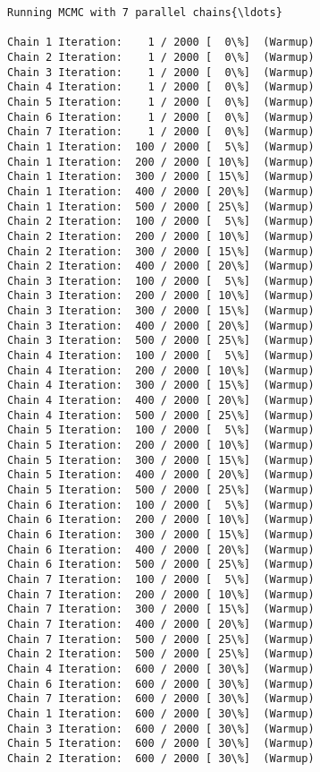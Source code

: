 \documentclass[11pt]{article}
\begin{document}
    \begin{Verbatim}[commandchars=\\\{\}]
Running MCMC with 7 parallel chains{\ldots}

Chain 1 Iteration:    1 / 2000 [  0\%]  (Warmup)
Chain 2 Iteration:    1 / 2000 [  0\%]  (Warmup)
Chain 3 Iteration:    1 / 2000 [  0\%]  (Warmup)
Chain 4 Iteration:    1 / 2000 [  0\%]  (Warmup)
Chain 5 Iteration:    1 / 2000 [  0\%]  (Warmup)
Chain 6 Iteration:    1 / 2000 [  0\%]  (Warmup)
Chain 7 Iteration:    1 / 2000 [  0\%]  (Warmup)
Chain 1 Iteration:  100 / 2000 [  5\%]  (Warmup)
Chain 1 Iteration:  200 / 2000 [ 10\%]  (Warmup)
Chain 1 Iteration:  300 / 2000 [ 15\%]  (Warmup)
Chain 1 Iteration:  400 / 2000 [ 20\%]  (Warmup)
Chain 1 Iteration:  500 / 2000 [ 25\%]  (Warmup)
Chain 2 Iteration:  100 / 2000 [  5\%]  (Warmup)
Chain 2 Iteration:  200 / 2000 [ 10\%]  (Warmup)
Chain 2 Iteration:  300 / 2000 [ 15\%]  (Warmup)
Chain 2 Iteration:  400 / 2000 [ 20\%]  (Warmup)
Chain 3 Iteration:  100 / 2000 [  5\%]  (Warmup)
Chain 3 Iteration:  200 / 2000 [ 10\%]  (Warmup)
Chain 3 Iteration:  300 / 2000 [ 15\%]  (Warmup)
Chain 3 Iteration:  400 / 2000 [ 20\%]  (Warmup)
Chain 3 Iteration:  500 / 2000 [ 25\%]  (Warmup)
Chain 4 Iteration:  100 / 2000 [  5\%]  (Warmup)
Chain 4 Iteration:  200 / 2000 [ 10\%]  (Warmup)
Chain 4 Iteration:  300 / 2000 [ 15\%]  (Warmup)
Chain 4 Iteration:  400 / 2000 [ 20\%]  (Warmup)
Chain 4 Iteration:  500 / 2000 [ 25\%]  (Warmup)
Chain 5 Iteration:  100 / 2000 [  5\%]  (Warmup)
Chain 5 Iteration:  200 / 2000 [ 10\%]  (Warmup)
Chain 5 Iteration:  300 / 2000 [ 15\%]  (Warmup)
Chain 5 Iteration:  400 / 2000 [ 20\%]  (Warmup)
Chain 5 Iteration:  500 / 2000 [ 25\%]  (Warmup)
Chain 6 Iteration:  100 / 2000 [  5\%]  (Warmup)
Chain 6 Iteration:  200 / 2000 [ 10\%]  (Warmup)
Chain 6 Iteration:  300 / 2000 [ 15\%]  (Warmup)
Chain 6 Iteration:  400 / 2000 [ 20\%]  (Warmup)
Chain 6 Iteration:  500 / 2000 [ 25\%]  (Warmup)
Chain 7 Iteration:  100 / 2000 [  5\%]  (Warmup)
Chain 7 Iteration:  200 / 2000 [ 10\%]  (Warmup)
Chain 7 Iteration:  300 / 2000 [ 15\%]  (Warmup)
Chain 7 Iteration:  400 / 2000 [ 20\%]  (Warmup)
Chain 7 Iteration:  500 / 2000 [ 25\%]  (Warmup)
Chain 2 Iteration:  500 / 2000 [ 25\%]  (Warmup)
Chain 4 Iteration:  600 / 2000 [ 30\%]  (Warmup)
Chain 6 Iteration:  600 / 2000 [ 30\%]  (Warmup)
Chain 7 Iteration:  600 / 2000 [ 30\%]  (Warmup)
Chain 1 Iteration:  600 / 2000 [ 30\%]  (Warmup)
Chain 3 Iteration:  600 / 2000 [ 30\%]  (Warmup)
Chain 5 Iteration:  600 / 2000 [ 30\%]  (Warmup)
Chain 2 Iteration:  600 / 2000 [ 30\%]  (Warmup)

\end{Verbatim}
\end{document}

